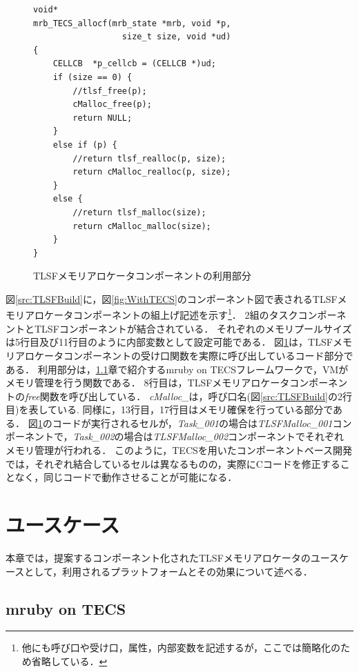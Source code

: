 \documentclass[submit,techrep]{ipsj_v2/UTF8/ipsj}
\begin{document}
\begin{figure}[t]
\centering
\begin{lstlisting}
void*
mrb_TECS_allocf(mrb_state *mrb, void *p, 
                  size_t size, void *ud)
{
    CELLCB	*p_cellcb = (CELLCB *)ud;
    if (size == 0) {
        //tlsf_free(p);
        cMalloc_free(p);
        return NULL;
    }
    else if (p) {
        //return tlsf_realloc(p, size);
        return cMalloc_realloc(p, size);
    }
    else {
        //return tlsf_malloc(size);
        return cMalloc_malloc(size);
    }
}
\end{lstlisting}
\caption{TLSFメモリアロケータコンポーネントの利用部分}  
\label{src:TLSFC}
\end{figure}

図\ref{src:TLSFBuild}に，図\ref{fig:WithTECS}のコンポーネント図で表されるTLSFメモリアロケータコンポーネントの組上げ記述を示す\footnote{他にも呼び口や受け口，属性，内部変数を記述するが，ここでは簡略化のため省略している．}．
2組のタスクコンポーネントとTLSFコンポーネントが結合されている．
それぞれのメモリプールサイズは5行目及び11行目のように内部変数として設定可能である．
図\ref{src:TLSFC}は，TLSFメモリアロケータコンポーネントの受け口関数を実際に呼び出しているコード部分である．
利用部分は，\ref{sec:mrubyonTECS}章で紹介するmruby on TECSフレームワーク\cite{par:mrubyonTECS}\cite{par:mrubyonTECS2}で，VMがメモリ管理を行う関数である．
8行目は，TLSFメモリアロケータコンポーネントの{\it free}関数を呼び出している．
{\it cMalloc\_}は，呼び口名(図\ref{src:TLSFBuild}の2行目)を表している.
同様に，13行目，17行目はメモリ確保を行っている部分である．
図\ref{src:TLSFC}のコードが実行されるセルが，{\it Task\_001}の場合は{\it TLSFMalloc\_001}コンポーネントで，{\it Task\_002}の場合は{\it TLSFMalloc\_002}コンポーネントでそれぞれメモリ管理が行われる．
このように，TECSを用いたコンポーネントベース開発では，それぞれ結合しているセルは異なるものの，実際にCコードを修正することなく，同じコードで動作させることが可能になる．



\section{ユースケース}
\label{sec:UseCase}

本章では，提案するコンポーネント化されたTLSFメモリアロケータのユースケースとして，利用されるプラットフォームとその効果について述べる．

\subsection{mruby on TECS}
\label{sec:mrubyonTECS}
\end{document}
